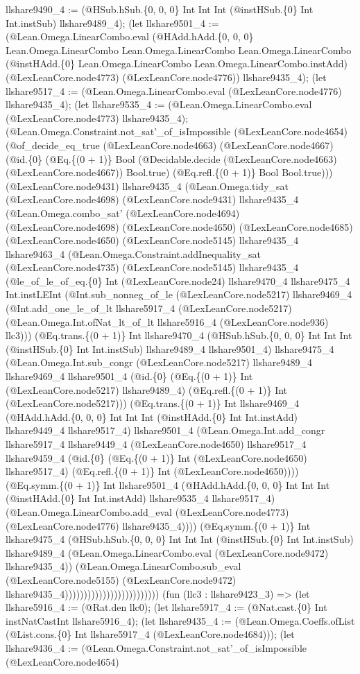 \documentclass[11pt]{article}
\begin{document}
llshare9490\_4 := (@HSub.hSub.\{0, 0, 0\} Int Int Int (@instHSub.\{0\} Int Int.instSub) llshare9489\_4); (let llshare9501\_4 := (@Lean.Omega.LinearCombo.eval (@HAdd.hAdd.\{0, 0, 0\} Lean.Omega.LinearCombo Lean.Omega.LinearCombo Lean.Omega.LinearCombo (@instHAdd.\{0\} Lean.Omega.LinearCombo Lean.Omega.LinearCombo.instAdd) (@LexLeanCore.node4773) (@LexLeanCore.node4776)) llshare9435\_4); (let llshare9517\_4 := (@Lean.Omega.LinearCombo.eval (@LexLeanCore.node4776) llshare9435\_4); (let llshare9535\_4 := (@Lean.Omega.LinearCombo.eval (@LexLeanCore.node4773) llshare9435\_4); (@Lean.Omega.Constraint.not\_sat'\_of\_isImpossible (@LexLeanCore.node4654) (@of\_decide\_eq\_true (@LexLeanCore.node4663) (@LexLeanCore.node4667) (@id.\{0\} (@Eq.\{(0 + 1)\} Bool (@Decidable.decide (@LexLeanCore.node4663) (@LexLeanCore.node4667)) Bool.true) (@Eq.refl.\{(0 + 1)\} Bool Bool.true))) (@LexLeanCore.node9431) llshare9435\_4 (@Lean.Omega.tidy\_sat (@LexLeanCore.node4698) (@LexLeanCore.node9431) llshare9435\_4 (@Lean.Omega.combo\_sat' (@LexLeanCore.node4694) (@LexLeanCore.node4698) (@LexLeanCore.node4650) (@LexLeanCore.node4685) (@LexLeanCore.node4650) (@LexLeanCore.node5145) llshare9435\_4 llshare9463\_4 (@Lean.Omega.Constraint.addInequality\_sat (@LexLeanCore.node4735) (@LexLeanCore.node5145) llshare9435\_4 (@le\_of\_le\_of\_eq.\{0\} Int (@LexLeanCore.node24) llshare9470\_4 llshare9475\_4 Int.instLEInt (@Int.sub\_nonneg\_of\_le (@LexLeanCore.node5217) llshare9469\_4 (@Int.add\_one\_le\_of\_lt llshare5917\_4 (@LexLeanCore.node5217) (@Lean.Omega.Int.ofNat\_lt\_of\_lt llshare5916\_4 (@LexLeanCore.node936) llc3))) (@Eq.trans.\{(0 + 1)\} Int llshare9470\_4 (@HSub.hSub.\{0, 0, 0\} Int Int Int (@instHSub.\{0\} Int Int.instSub) llshare9489\_4 llshare9501\_4) llshare9475\_4 (@Lean.Omega.Int.sub\_congr (@LexLeanCore.node5217) llshare9489\_4 llshare9469\_4 llshare9501\_4 (@id.\{0\} (@Eq.\{(0 + 1)\} Int (@LexLeanCore.node5217) llshare9489\_4) (@Eq.refl.\{(0 + 1)\} Int (@LexLeanCore.node5217))) (@Eq.trans.\{(0 + 1)\} Int llshare9469\_4 (@HAdd.hAdd.\{0, 0, 0\} Int Int Int (@instHAdd.\{0\} Int Int.instAdd) llshare9449\_4 llshare9517\_4) llshare9501\_4 (@Lean.Omega.Int.add\_congr llshare5917\_4 llshare9449\_4 (@LexLeanCore.node4650) llshare9517\_4 llshare9459\_4 (@id.\{0\} (@Eq.\{(0 + 1)\} Int (@LexLeanCore.node4650) llshare9517\_4) (@Eq.refl.\{(0 + 1)\} Int (@LexLeanCore.node4650)))) (@Eq.symm.\{(0 + 1)\} Int llshare9501\_4 (@HAdd.hAdd.\{0, 0, 0\} Int Int Int (@instHAdd.\{0\} Int Int.instAdd) llshare9535\_4 llshare9517\_4) (@Lean.Omega.LinearCombo.add\_eval (@LexLeanCore.node4773) (@LexLeanCore.node4776) llshare9435\_4)))) (@Eq.symm.\{(0 + 1)\} Int llshare9475\_4 (@HSub.hSub.\{0, 0, 0\} Int Int Int (@instHSub.\{0\} Int Int.instSub) llshare9489\_4 (@Lean.Omega.LinearCombo.eval (@LexLeanCore.node9472) llshare9435\_4)) (@Lean.Omega.LinearCombo.sub\_eval (@LexLeanCore.node5155) (@LexLeanCore.node9472) llshare9435\_4))))))))))))))))))))))))) (fun (llc3 : llshare9423\_3) => (let llshare5916\_4 := (@Rat.den llc0); (let llshare5917\_4 := (@Nat.cast.\{0\} Int instNatCastInt llshare5916\_4); (let llshare9435\_4 := (@Lean.Omega.Coeffs.ofList (@List.cons.\{0\} Int llshare5917\_4 (@LexLeanCore.node4684))); (let llshare9436\_4 := (@Lean.Omega.Constraint.not\_sat'\_of\_isImpossible (@LexLeanCore.node4654) 
\end{document}
